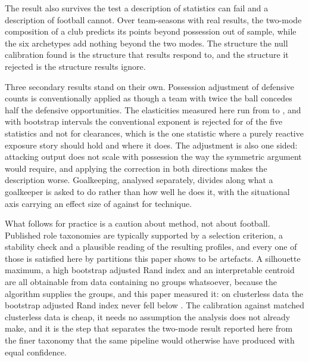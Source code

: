 The result also survives the test a description of statistics can fail and a description of
football cannot. Over \OutN{} team-seasons with real results, the two-mode composition of a
club predicts its points beyond possession out of sample, while the six archetypes add
nothing beyond the two modes. The structure the null calibration found is the structure
that results respond to, and the structure it rejected is the structure results ignore.

Three secondary results stand on their own. Possession adjustment of defensive counts
is conventionally applied as though a team with twice the ball concedes half the defensive
opportunities. The elasticities measured here run from \ArcElastTackles{} to
\ArcElastClearances{}, and with bootstrap intervals the conventional exponent is rejected
for \NElastExcludeOne{} of the five statistics and not for clearances, which is the one
statistic where a purely reactive exposure story should hold and where it does.
The adjustment is also one sided: attacking output does not scale with possession the way the
symmetric argument would require, and applying the correction in both directions makes the
description worse. Goalkeeping, analysed separately, divides along what a goalkeeper is asked
to do rather than how well he does it, with the situational axis carrying an effect size of
\ArcKeeperEtaFullSituation{} against \ArcKeeperEtaFullTechnique{} for technique.

What follows for practice is a caution about method, not about football. Published
role taxonomies are typically supported by a selection criterion, a stability check and a
plausible reading of the resulting profiles, and every one of those is satisfied here by
partitions this paper shows to be artefacts. A silhouette maximum, a high bootstrap adjusted
Rand index and an interpretable centroid are all obtainable from data containing no groups
whatsoever, because the algorithm supplies the groups, and this paper measured it: on
clusterless data the bootstrap adjusted Rand index never fell below
\StrBootNullMinSingle{}. The calibration against matched
clusterless data is cheap, it needs no assumption the analysis does not already make, and it
is the step that separates the two-mode result reported here from the finer taxonomy that the
same pipeline would otherwise have produced with equal confidence.
